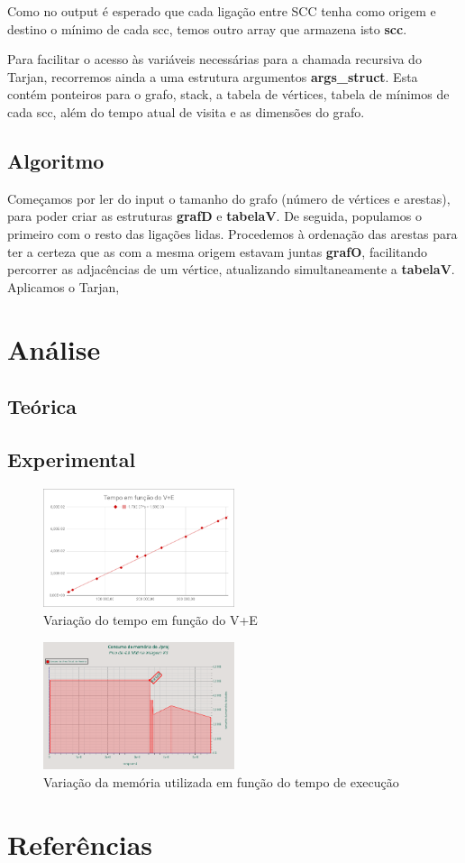 \documentclass[12pt,a4paper]{article}
\begin{document}
Como no output é esperado que cada ligação entre SCC tenha como origem e destino o mínimo de cada scc, temos outro array que armazena isto \textbf{scc}.

Para facilitar o acesso às variáveis necessárias para a chamada recursiva do Tarjan, recorremos ainda a uma estrutura argumentos \textbf{args\_struct}. Esta contém ponteiros para o grafo, stack, a tabela de vértices, tabela de mínimos de cada scc, além do tempo atual de visita e as dimensões do grafo.
\subsection{Algoritmo}
Começamos por ler do input o tamanho do grafo (número de vértices e arestas), para poder criar as estruturas \textbf{grafD} e \textbf{tabelaV}. De seguida, populamos o primeiro com o resto das ligações lidas.
Procedemos à ordenação das arestas para ter a certeza que as com a mesma origem estavam juntas \textbf{grafO}, facilitando percorrer as adjacências de um vértice, atualizando simultaneamente a \textbf{tabelaV}.
Aplicamos o Tarjan,

\section{Análise}
\subsection{Teórica}
\subsection{Experimental}

\begin{figure}[h]
			\centering
			\includegraphics[width=0.5\textwidth]{ss_t(V+E)}
			\caption{Variação do tempo em função do V+E}
\end{figure}
\begin{figure}[h]
			\centering
			\includegraphics[width=0.5\textwidth]{ss_m(tex)}
			\caption{Variação da memória utilizada em função do tempo de execução}
\end{figure}

\section{Referências}
\end{document}
